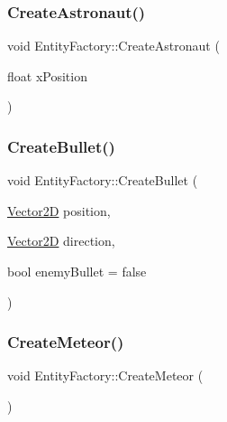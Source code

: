 \hypertarget{class_entity_factory_a825d95311fabc8edee88c6dda69346f4}{}\label{class_entity_factory_a825d95311fabc8edee88c6dda69346f4} 
\subsubsection{\texorpdfstring{Create\+Astronaut()}{CreateAstronaut()}}
{\footnotesize\ttfamily void Entity\+Factory\+::\+Create\+Astronaut (\begin{DoxyParamCaption}\item[{float}]{x\+Position }\end{DoxyParamCaption})\hspace{0.3cm}{\ttfamily [static]}}

\hypertarget{class_entity_factory_a12afa2409278355f081201d888af9467}{}\label{class_entity_factory_a12afa2409278355f081201d888af9467} 
\subsubsection{\texorpdfstring{Create\+Bullet()}{CreateBullet()}}
{\footnotesize\ttfamily void Entity\+Factory\+::\+Create\+Bullet (\begin{DoxyParamCaption}\item[{\hyperlink{class_vector2_d}{Vector2D}}]{position,  }\item[{\hyperlink{class_vector2_d}{Vector2D}}]{direction,  }\item[{bool}]{enemy\+Bullet = {\ttfamily false} }\end{DoxyParamCaption})\hspace{0.3cm}{\ttfamily [static]}}

\hypertarget{class_entity_factory_a679ed3727e2f00e4fe15576c7fd5144d}{}\label{class_entity_factory_a679ed3727e2f00e4fe15576c7fd5144d} 
\subsubsection{\texorpdfstring{Create\+Meteor()}{CreateMeteor()}}
{\footnotesize\ttfamily void Entity\+Factory\+::\+Create\+Meteor (\begin{DoxyParamCaption}{ }\end{DoxyParamCaption})\hspace{0.3cm}{\ttfamily [static]}}

